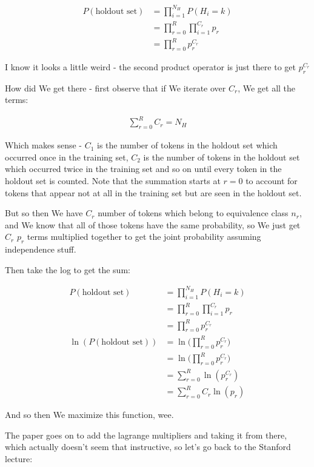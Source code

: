 \documentclass{article}
\begin{document}
			\begin{align}
				P(\text{holdout set}) &= \prod^{N_H}_{i=1} P(H_i = k)\\
				&= \prod^{R}_{r=0} \prod^{C_r}_{i=1}  p_r\\
				&= \prod^{R}_{r=0} p_r^{C_r}
			\end{align}
			
			I know it looks a little weird - the second product operator is just there to get $p_r^{C_r}$
			
			How did We get there - first observe that if We iterate over $C_r$, We get all the terms:
			
			\begin{align}
				\sum^R_{r=0} C_r = N_H
			\end{align}
			
			Which makes sense - $C_1$ is the number of tokens in the holdout set which occurred once in the training set, $C_2$ is the number of tokens in the holdout set which occurred twice in the training set and so on until every token in the holdout set is counted. Note that the summation starts at $r=0$ to account for tokens that appear not at all in the training set but are seen in the holdout set.
			
			But so then We have $C_r$ number of tokens which belong to equivalence class $n_r$, and We know that all of those tokens have the same probability, so We just get $C_r$ $p_r$ terms multiplied together to get the joint probability assuming independence stuff.
			
			Then take the log to get the sum: 
			
			\begin{align}
				P(\text{holdout set}) &= \prod^{N_H}_{i=1} P(H_i = k)\\
				&= \prod^{R}_{r=0} \prod^{C_r}_{i=1}  p_r\\
				&= \prod^{R}_{r=0} p_r^{C_r}\\
				\ln(P(\text{holdout set})) &= \ln\bigg( \prod^{R}_{r=0} p_r^{C_r} \bigg)\\
				&= \ln\bigg( \prod^{R}_{r=0} p_r^{C_r} \bigg)\\
				&= \sum^{R}_{r=0} \ln(p_r^{C_r}) \\
				&= \sum^{R}_{r=0} C_r\ln(p_r) 
			\end{align}
			
			And so then We maximize this function, wee.
			
			The paper goes on to add the lagrange multipliers and taking it from there, which actually doesn't seem that instructive, so let's go back to the Stanford lecture:
			
\end{document}

